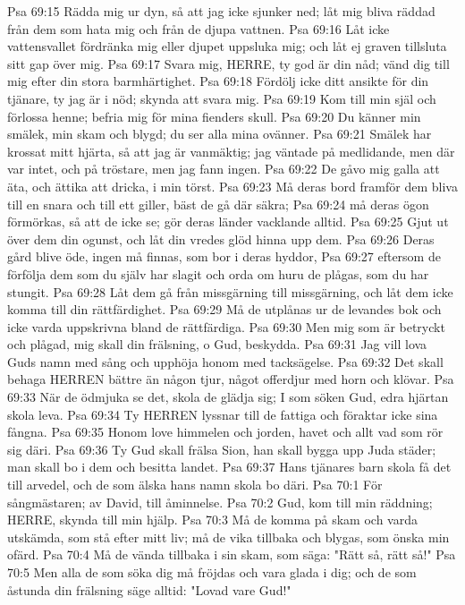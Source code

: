 Psa 69:15  Rädda mig ur dyn, så att jag icke sjunker ned; låt mig bliva räddad från dem som hata mig och från de djupa vattnen.
Psa 69:16  Låt icke vattensvallet fördränka mig eller djupet uppsluka mig; och låt ej graven tillsluta sitt gap över mig.
Psa 69:17  Svara mig, HERRE, ty god är din nåd; vänd dig till mig efter din stora barmhärtighet.
Psa 69:18  Fördölj icke ditt ansikte för din tjänare, ty jag är i nöd; skynda att svara mig.
Psa 69:19  Kom till min själ och förlossa henne; befria mig för mina fienders skull.
Psa 69:20  Du känner min smälek, min skam och blygd; du ser alla mina ovänner.
Psa 69:21  Smälek har krossat mitt hjärta, så att jag är vanmäktig; jag väntade på medlidande, men där var intet, och på tröstare, men jag fann ingen.
Psa 69:22  De gåvo mig galla att äta, och ättika att dricka, i min törst.
Psa 69:23  Må deras bord framför dem bliva till en snara och till ett giller, bäst de gå där säkra;
Psa 69:24  må deras ögon förmörkas, så att de icke se; gör deras länder vacklande alltid.
Psa 69:25  Gjut ut över dem din ogunst, och låt din vredes glöd hinna upp dem.
Psa 69:26  Deras gård blive öde, ingen må finnas, som bor i deras hyddor,
Psa 69:27  eftersom de förfölja dem som du själv har slagit och orda om huru de plågas, som du har stungit.
Psa 69:28  Låt dem gå från missgärning till missgärning, och låt dem icke komma till din rättfärdighet.
Psa 69:29  Må de utplånas ur de levandes bok och icke varda uppskrivna bland de rättfärdiga.
Psa 69:30  Men mig som är betryckt och plågad, mig skall din frälsning, o Gud, beskydda.
Psa 69:31  Jag vill lova Guds namn med sång och upphöja honom med tacksägelse.
Psa 69:32  Det skall behaga HERREN bättre än någon tjur, något offerdjur med horn och klövar.
Psa 69:33  När de ödmjuka se det, skola de glädja sig; I som söken Gud, edra hjärtan skola leva.
Psa 69:34  Ty HERREN lyssnar till de fattiga och föraktar icke sina fångna.
Psa 69:35  Honom love himmelen och jorden, havet och allt vad som rör sig däri.
Psa 69:36  Ty Gud skall frälsa Sion, han skall bygga upp Juda städer; man skall bo i dem och besitta landet.
Psa 69:37  Hans tjänares barn skola få det till arvedel, och de som älska hans namn skola bo däri.
Psa 70:1  För sångmästaren; av David, till åminnelse.
Psa 70:2  Gud, kom till min räddning; HERRE, skynda till min hjälp.
Psa 70:3  Må de komma på skam och varda utskämda, som stå efter mitt liv; må de vika tillbaka och blygas, som önska min ofärd.
Psa 70:4  Må de vända tillbaka i sin skam, som säga: "Rätt så, rätt så!"
Psa 70:5  Men alla de som söka dig må fröjdas och vara glada i dig; och de som åstunda din frälsning säge alltid: "Lovad vare Gud!"

